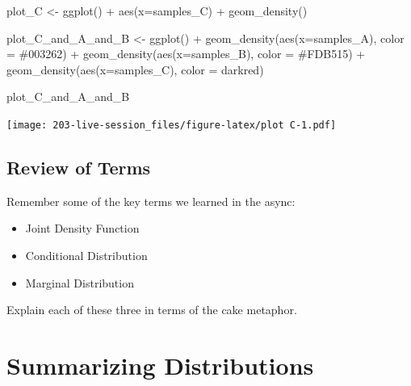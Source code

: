 \documentclass[
]{book}
\newenvironment{Shaded}{\begin{snugshade}}{\end{snugshade}}
\newcommand{\AttributeTok}[1]{\textcolor[rgb]{0.77,0.63,0.00}{#1}}
\newcommand{\FunctionTok}[1]{\textcolor[rgb]{0.00,0.00,0.00}{#1}}
\newcommand{\NormalTok}[1]{#1}
\newcommand{\OtherTok}[1]{\textcolor[rgb]{0.56,0.35,0.01}{#1}}
\newcommand{\SpecialCharTok}[1]{\textcolor[rgb]{0.00,0.00,0.00}{#1}}
\newcommand{\StringTok}[1]{\textcolor[rgb]{0.31,0.60,0.02}{#1}}
\providecommand{\tightlist}{%
  \setlength{\itemsep}{0pt}\setlength{\parskip}{0pt}}
\theoremstyle{definition}
\theoremstyle{definition}
\theoremstyle{definition}
\theoremstyle{definition}
\theoremstyle{remark}
\begin{document}
\begin{Shaded}
\begin{Highlighting}[]
\NormalTok{plot\_C }\OtherTok{\textless{}{-}} \FunctionTok{ggplot}\NormalTok{() }\SpecialCharTok{+} 
  \FunctionTok{aes}\NormalTok{(}\AttributeTok{x=}\NormalTok{samples\_C) }\SpecialCharTok{+} 
  \FunctionTok{geom\_density}\NormalTok{()}

\NormalTok{plot\_C\_and\_A\_and\_B }\OtherTok{\textless{}{-}} \FunctionTok{ggplot}\NormalTok{()   }\SpecialCharTok{+} 
  \FunctionTok{geom\_density}\NormalTok{(}\FunctionTok{aes}\NormalTok{(}\AttributeTok{x=}\NormalTok{samples\_A), }\AttributeTok{color =} \StringTok{\textquotesingle{}\#003262\textquotesingle{}}\NormalTok{) }\SpecialCharTok{+} 
  \FunctionTok{geom\_density}\NormalTok{(}\FunctionTok{aes}\NormalTok{(}\AttributeTok{x=}\NormalTok{samples\_B), }\AttributeTok{color =} \StringTok{\textquotesingle{}\#FDB515\textquotesingle{}}\NormalTok{) }\SpecialCharTok{+} 
  \FunctionTok{geom\_density}\NormalTok{(}\FunctionTok{aes}\NormalTok{(}\AttributeTok{x=}\NormalTok{samples\_C), }\AttributeTok{color =} \StringTok{\textquotesingle{}darkred\textquotesingle{}}\NormalTok{)}

\NormalTok{plot\_C\_and\_A\_and\_B}
\end{Highlighting}
\end{Shaded}

\texttt{[image: 203-live-session\_files/figure-latex/plot C-1.pdf]}

\hypertarget{review-of-terms}{%
\section{Review of Terms}\label{review-of-terms}}

Remember some of the key terms we learned in the async:

\begin{itemize}
\tightlist
\item
  Joint Density Function
\item
  Conditional Distribution
\item
  Marginal Distribution
\end{itemize}

Explain each of these three in terms of the cake metaphor.

\hypertarget{summarizing-distributions}{%
\chapter{Summarizing Distributions}\label{summarizing-distributions}}
\end{document}
